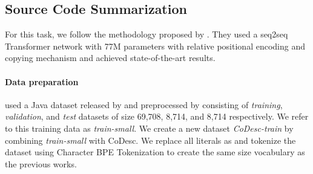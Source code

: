 \documentclass[11pt,a4paper]{article}
\begin{document}
\begin{table}
\setlength\arrayrulewidth{.75pt}
\caption{Baseline models trained with default dataset and CoDesc, along with, comparison with SoTA pretrained models in \textsc{CSN} Java test set. Training on CoDesc outperforms training on CSN-Java only, and it is comparable to SOTA with 8x fewer parameters.}
\label{tab:csn-results}
\end{table}


\subsection{Source Code Summarization}
For this task, we follow the methodology proposed by \citet{ncs}. They used a seq2seq Transformer \cite{transformer} network with 77M parameters with relative positional encoding \cite{shaw} and copying mechanism \cite{copy} and achieved state-of-the-art results.

\paragraph{Data preparation} 
\citet{ncs} used a Java dataset released by \citet{hu} and preprocessed by \citet{wei2019code} consisting of \textit{training}, \textit{validation}, and \textit{test} datasets of size 69,708, 8,714, and 8,714 respectively. We refer to this training data as \textit{train-small}. We create a new dataset \textit{CoDesc-train} by combining \textit{train-small} with CoDesc.
We replace all literals as \citet{wei2019code} and tokenize the dataset using Character BPE Tokenization \cite{bpe} to create the same size vocabulary as the previous works.
\end{document}
